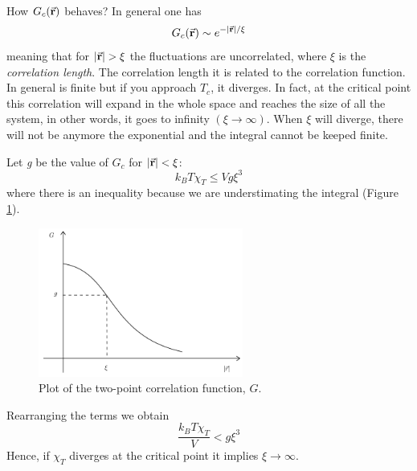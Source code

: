 \documentclass[../main/main.tex]{subfiles}
\begin{document}
How \( G_c (\va{r}) \) behaves? In general one has
\begin{equation}
  G_c (\va{r}) \sim e^{- \abs{\va{r}}/\xi  }
\end{equation}
meaning that for \( \abs{\va{r}} > \xi   \) the fluctuations are uncorrelated, where \( \xi  \) is the \emph{correlation length}.
The correlation length it is related to the correlation function. In general is finite but if you approach \( T_c \), it diverges. In fact, at the critical point this correlation will expand in the whole space and reaches the size of all the system, in other words, it goes to infinity \( (\xi \rightarrow \infty ) \). When \( \xi  \)  will diverge, there will not be anymore the exponential and the integral cannot be keeped finite.


Let \emph{g} be the value of \( G_c \) for \( \abs{\va{r}} < \xi \):
\begin{equation}
  k_B T \chi _T \le V g \xi ^3
\end{equation}
where there is an inequality because we are understimating the integral (Figure \ref{fig:5_1}).

\begin{figure}[h!]
\centering
\includegraphics[width=0.6\textwidth]{../lessons/5_image/1.pdf}
\caption{\label{fig:5_1} Plot of the  two-point correlation function, \( G \).}
\end{figure}

\noindent Rearranging the terms we obtain
\begin{equation}
  \frac{k_B T \chi _T}{V} < g \xi ^3
\end{equation}
Hence, if \( \chi _T \) diverges at the critical point it implies \( \xi \rightarrow \infty  \).
\end{document}
